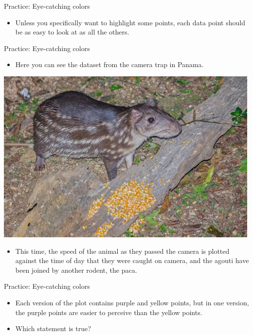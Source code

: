 \documentclass[
  ignorenonframetext,
]{beamer}
\providecommand{\tightlist}{%
  \setlength{\itemsep}{0pt}\setlength{\parskip}{0pt}}
\begin{document}
\begin{frame}{Practice: Eye-catching colors}
\label{practice-eye-catching-colors-1}
\begin{itemize}
\tightlist
\item
  Unless you specifically want to highlight some points, each data point
  should be as easy to look at as all the others.
\end{itemize}
\end{frame}

\begin{frame}{Practice: Eye-catching colors}
\label{practice-eye-catching-colors-2}
\begin{itemize}
\tightlist
\item
  Here you can see the dataset from the camera trap in Panama.
\end{itemize}

\includegraphics{../images/im88.jpg}

\begin{itemize}
\tightlist
\item
  This time, the speed of the animal as they passed the camera is
  plotted against the time of day that they were caught on camera, and
  the agouti have been joined by another rodent, the paca.
\end{itemize}
\end{frame}

\begin{frame}{Practice: Eye-catching colors}
\label{practice-eye-catching-colors-3}
\begin{itemize}
\item
  Each version of the plot contains purple and yellow points, but in one
  version, the purple points are easier to perceive than the yellow
  points.
\item
  Which statement is true?
\end{itemize}
\end{frame}
\end{document}
